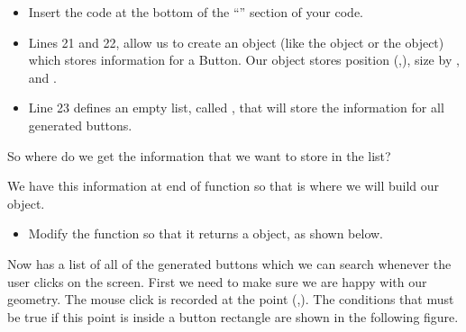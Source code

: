 \documentclass{coderdojo}
\newcommand\TODO[1]{
\begin{itemize}
\item[\todoSymbol] \color{todo} #1
\end{itemize}}
\begin{document}
\TODO{Insert the code at the bottom of the ``\code{Create screen}'' section of your code.}


\begin{itemize}
\item
Lines 21 and 22, allow us to create an object (like the  object or the  object) which stores information for a Button. Our  object stores position (,), size   by , and .
\item
Line 23 defines an empty list, called , that will store the information for all generated buttons.
\end{itemize}

So where do we get the information that we want to store in the  list?  

We have this information at end of  function so that is where we will build our  object.

\TODO{Modify the  function so that it returns a \code{Button} object, as shown below.}
 

Now  has a list of all of the generated buttons which we can search whenever the user clicks on the screen. First we need to make sure we are happy with our geometry. The mouse click is recorded at the point (,).  The conditions that must be true if this point is inside a button rectangle are shown in the following figure.
\end{document}

